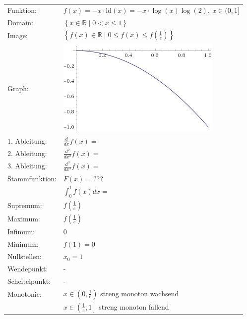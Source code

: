 \documentclass[fleqn,a4paper,12pt]{article}
\newcommand{\R}{{\mathbb R}}
\begin{document}
	\begin{tabular}{l l}
		Funktion:		& $f(x) = -x \cdot \text{ld}(x) = -x\cdot{\log(x)}{\log(2)},\ x\in(0,1]$\\
		Domain:			& $\left\lbrace x\in\R\mid 0 < x \le 1\right\rbrace$\\
		Image:			& $\left\lbrace f(x)\in\R\mid 0 \le f(x) \le f\left(\frac{1}{e}\right) \right\rbrace$\\
		Graph:			& \includegraphics{plot-x2.jpg}\\
		1. Ableitung:	& $\frac{d}{dx}f(x) = $\\
		2. Ableitung:	& $\frac{d^2}{dx^2}f(x) = $\\
		3. Ableitung:	& $\frac{d^3}{dx^3}f(x) = $\\
		Stammfunktion:	& $F(x) = $???\\
						& $\int_0^1 f(x) dx = $\\
		Supremum:		& $f\left(\frac{1}{e}\right)$\\
		Maximum:		& $f\left(\frac{1}{e}\right)$\\
		Infimum:		& $0$\\
		Minimum:		& $f(1) = 0$\\
		Nullstellen:	& $x_0 = 1$\\
		Wendepunkt:		& -\\
		Scheitelpunkt:	& -\\
		Monotonie:		& $x\in\left(0,\frac{1}{e}\right)$ streng monoton wachsend\\
						& $x\in\left(\frac{1}{e},1\right]$ streng monoton fallend
						
	\end{tabular}
\end{document}
